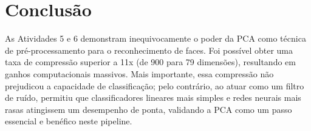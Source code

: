 \documentclass[a4paper,12pt]{article}
\begin{document}
\section{Conclusão}

As Atividades 5 e 6 demonstram inequivocamente o poder da PCA como técnica de pré-processamento para o reconhecimento de faces. Foi possível obter uma taxa de compressão superior a 11x (de 900 para 79 dimensões), resultando em ganhos computacionais massivos. Mais importante, essa compressão não prejudicou a capacidade de classificação; pelo contrário, ao atuar como um filtro de ruído, permitiu que classificadores lineares mais simples e redes neurais mais rasas atingissem um desempenho de ponta, validando a PCA como um passo essencial e benéfico neste pipeline.
\end{document}
